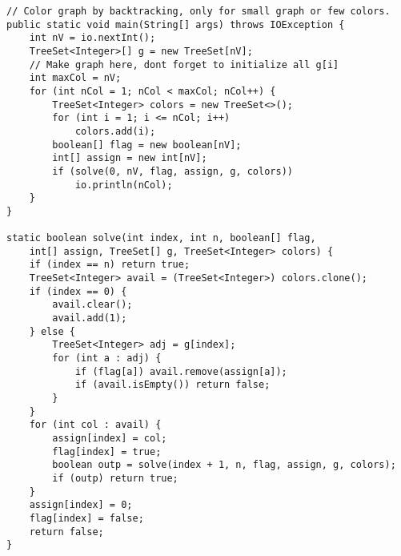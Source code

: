 \begin{verbatim}
// Color graph by backtracking, only for small graph or few colors.
public static void main(String[] args) throws IOException {
	int nV = io.nextInt();
	TreeSet<Integer>[] g = new TreeSet[nV];
	// Make graph here, dont forget to initialize all g[i]
	int maxCol = nV;
	for (int nCol = 1; nCol < maxCol; nCol++) {
		TreeSet<Integer> colors = new TreeSet<>();
		for (int i = 1; i <= nCol; i++) 
			colors.add(i);
		boolean[] flag = new boolean[nV];
		int[] assign = new int[nV];
		if (solve(0, nV, flag, assign, g, colors))
			io.println(nCol);
	}
}

static boolean solve(int index, int n, boolean[] flag, 
	int[] assign, TreeSet[] g, TreeSet<Integer> colors) {
	if (index == n) return true;
	TreeSet<Integer> avail = (TreeSet<Integer>) colors.clone();
	if (index == 0) {
		avail.clear();
		avail.add(1);
	} else {
		TreeSet<Integer> adj = g[index];
		for (int a : adj) { 
			if (flag[a]) avail.remove(assign[a]);
			if (avail.isEmpty()) return false;
		}
	}
	for (int col : avail) {
		assign[index] = col;
		flag[index] = true;
		boolean outp = solve(index + 1, n, flag, assign, g, colors);
		if (outp) return true;
	}
	assign[index] = 0;
	flag[index] = false;
	return false;
}
\end{verbatim}
